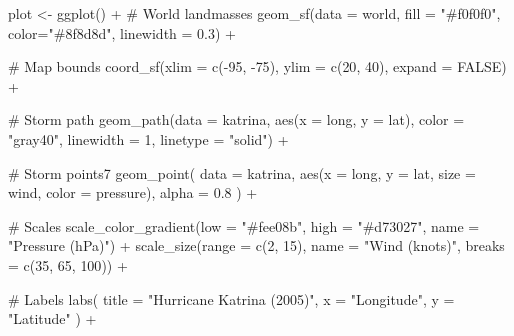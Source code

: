 \documentclass[
  letterpaper,
  DIV=11,
  numbers=noendperiod]{scrartcl}
\newenvironment{Shaded}{\begin{snugshade}}{\end{snugshade}}
\newcommand{\AttributeTok}[1]{\textcolor[rgb]{0.40,0.45,0.13}{#1}}
\newcommand{\CommentTok}[1]{\textcolor[rgb]{0.37,0.37,0.37}{#1}}
\newcommand{\ConstantTok}[1]{\textcolor[rgb]{0.56,0.35,0.01}{#1}}
\newcommand{\DecValTok}[1]{\textcolor[rgb]{0.68,0.00,0.00}{#1}}
\newcommand{\FloatTok}[1]{\textcolor[rgb]{0.68,0.00,0.00}{#1}}
\newcommand{\FunctionTok}[1]{\textcolor[rgb]{0.28,0.35,0.67}{#1}}
\newcommand{\NormalTok}[1]{\textcolor[rgb]{0.00,0.23,0.31}{#1}}
\newcommand{\OtherTok}[1]{\textcolor[rgb]{0.00,0.23,0.31}{#1}}
\newcommand{\SpecialCharTok}[1]{\textcolor[rgb]{0.37,0.37,0.37}{#1}}
\newcommand{\StringTok}[1]{\textcolor[rgb]{0.13,0.47,0.30}{#1}}
\begin{document}
\begin{Shaded}
\begin{Highlighting}[]
\NormalTok{plot }\OtherTok{\textless{}{-}} \FunctionTok{ggplot}\NormalTok{() }\SpecialCharTok{+}
  \CommentTok{\# World landmasses}
  \FunctionTok{geom\_sf}\NormalTok{(}\AttributeTok{data =}\NormalTok{ world, }\AttributeTok{fill =} \StringTok{"\#f0f0f0"}\NormalTok{, }\AttributeTok{color=}\StringTok{"\#8f8d8d"}\NormalTok{, }\AttributeTok{linewidth =} \FloatTok{0.3}\NormalTok{) }\SpecialCharTok{+}

  \CommentTok{\# Map bounds}
  \FunctionTok{coord\_sf}\NormalTok{(}\AttributeTok{xlim =} \FunctionTok{c}\NormalTok{(}\SpecialCharTok{{-}}\DecValTok{95}\NormalTok{, }\SpecialCharTok{{-}}\DecValTok{75}\NormalTok{), }\AttributeTok{ylim =} \FunctionTok{c}\NormalTok{(}\DecValTok{20}\NormalTok{, }\DecValTok{40}\NormalTok{), }\AttributeTok{expand =} \ConstantTok{FALSE}\NormalTok{) }\SpecialCharTok{+}

  \CommentTok{\# Storm path}
  \FunctionTok{geom\_path}\NormalTok{(}\AttributeTok{data =}\NormalTok{ katrina, }\FunctionTok{aes}\NormalTok{(}\AttributeTok{x =}\NormalTok{ long, }\AttributeTok{y =}\NormalTok{ lat), }
            \AttributeTok{color =} \StringTok{"gray40"}\NormalTok{, }\AttributeTok{linewidth =} \DecValTok{1}\NormalTok{, }\AttributeTok{linetype =} \StringTok{"solid"}\NormalTok{) }\SpecialCharTok{+}

  \CommentTok{\# Storm points7}
  \FunctionTok{geom\_point}\NormalTok{(}
    \AttributeTok{data =}\NormalTok{ katrina,}
    \FunctionTok{aes}\NormalTok{(}\AttributeTok{x =}\NormalTok{ long, }\AttributeTok{y =}\NormalTok{ lat, }\AttributeTok{size =}\NormalTok{ wind, }\AttributeTok{color =}\NormalTok{ pressure),}
    \AttributeTok{alpha =} \FloatTok{0.8}
\NormalTok{  ) }\SpecialCharTok{+}

  \CommentTok{\# Scales}
  \FunctionTok{scale\_color\_gradient}\NormalTok{(}\AttributeTok{low =} \StringTok{"\#fee08b"}\NormalTok{, }\AttributeTok{high =} \StringTok{"\#d73027"}\NormalTok{, }\AttributeTok{name =} \StringTok{"Pressure (hPa)"}\NormalTok{) }\SpecialCharTok{+}
  \FunctionTok{scale\_size}\NormalTok{(}\AttributeTok{range =} \FunctionTok{c}\NormalTok{(}\DecValTok{2}\NormalTok{, }\DecValTok{15}\NormalTok{), }\AttributeTok{name =} \StringTok{"Wind (knots)"}\NormalTok{, }\AttributeTok{breaks =} \FunctionTok{c}\NormalTok{(}\DecValTok{35}\NormalTok{, }\DecValTok{65}\NormalTok{, }\DecValTok{100}\NormalTok{)) }\SpecialCharTok{+}

  \CommentTok{\# Labels}
  \FunctionTok{labs}\NormalTok{(}
    \AttributeTok{title =} \StringTok{"Hurricane Katrina (2005)"}\NormalTok{,}
    \AttributeTok{x =} \StringTok{"Longitude"}\NormalTok{, }\AttributeTok{y =} \StringTok{"Latitude"}
\NormalTok{  ) }\SpecialCharTok{+}


\end{Highlighting}
\end{Shaded}
\end{document}
